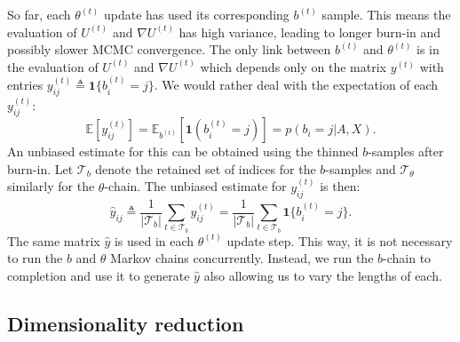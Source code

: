 So far, each $\theta^{(t)}$ update has used its corresponding $b^{(t)}$ sample. This means the evaluation of $U^{(t)}$ and $\nabla U^{(t)}$ has high variance, leading to longer burn-in and possibly slower MCMC convergence. The only link between $b^{(t)}$ and $\theta^{(t)}$ is in the evaluation of $U^{(t)}$ and $\nabla U^{(t)}$ which depends only on the matrix $y^{(t)}$ with entries $y_{ij}^{(t)} \triangleq \boldsymbol{1}\{b_i^{(t)} = j\}$. We would rather deal with the expectation of each $y_{ij}^{(t)}$:
%
\begin{equation}
	\mathbb{E} \left[ y_{ij}^{(t)} \right] = \mathbb{E}_{b^{(t)}} \left[ \boldsymbol{1} \left( b_{i}^{(t)} = j \right) \right]
	= p(b_i = j | A, X).
\end{equation}
%
An unbiased estimate for this can be obtained using 
the thinned $b$-samples after burn-in.
Let $\mathcal{T}_b$  denote the retained set of indices 
for the $b$-samples and $\mathcal{T}_\theta$ similarly for the $\theta$-chain. 
The unbiased estimate for $y_{ij}^{(t)}$ is then:
%
\begin{equation}
	\hat{y}_{ij} \triangleq \frac{1}{|\mathcal{T}_b|} \sum_{t \in \mathcal{T}_b} y_{ij}^{(t)} = \frac{1}{|\mathcal{T}_b|} \sum_{t \in \mathcal{T}_b} \boldsymbol{1}\{b_i^{(t)} = j\}.
	\label{eqn:y-hat}
\end{equation}
%
The same matrix $\hat{y}$ is used in each $\theta^{(t)}$ update step.
This way, it is not necessary to run the $b$ and $\theta$ Markov chains 
concurrently. Instead, we run the $b$-chain to completion and use it 
to generate $\hat{y}$ also allowing us to vary the lengths of each.

\subsection{Dimensionality reduction}
\label{sec:dim-reduction}

